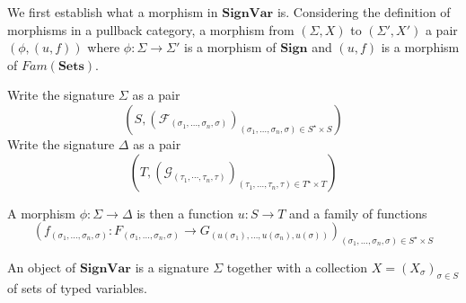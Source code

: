 \documentclass{article}
\newcommand{\mbf}{\mathbf}
\begin{document}
We first establish what a morphism in $\mbf{SignVar}$ is. Considering the definition of morphisms in a pullback category, a morphism from $(\Sigma, X)$ to $(\Sigma', X')$ a pair $(\phi,(u,f))$ where
$\phi : \Sigma \to \Sigma'$ is a morphism of $\mbf{Sign}$ and $(u,f)$ is a morphism of $\mathit{Fam}(\mbf{Sets})$.

Write the signature $\Sigma$ as a pair $$(S, (\mathcal F_{(\sigma_1 , \ldots , \sigma_n , \sigma)})_{(\sigma_1, \ldots, \sigma_n, \sigma) \in S^{\star} \times S} )$$
Write the signature $\Delta$ as a pair $$(T, (\mathcal G_{(\tau_1, \cdots, \tau_n, \tau)})_{(\tau_1, \ldots , \tau_n , \tau) \in T^\star \times T})$$

A morphism $\phi : \Sigma \to \Delta$ is then a function $u : S \to T$ and a family of functions $$(f_{(\sigma_1, \ldots, \sigma_n, \sigma)} : F_{(\sigma_1, \ldots, \sigma_n, \sigma)} \to G_{(u(\sigma_1), \ldots, u(\sigma_n), u(\sigma))})_{(\sigma_1, \ldots, \sigma_n, \sigma) \in S^\star \times S}$$
 
An object of $\mathbf{SignVar}$ is a signature $\Sigma$ together with a collection $X = (X_\sigma)_{\sigma \in S}$ of sets of typed variables.
\end{document}
